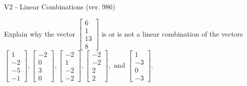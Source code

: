 \begin{exercise}
  \begin{exerciseTitle}V2 - Linear Combinations (ver. 986)\end{exerciseTitle}
  \begin{exerciseStatement}
    Explain why the vector \(\left[\begin{array}{c}
6 \\
1 \\
13 \\
8
\end{array}\right]\)  is or is not a linear 
	combination of the vectors \(\left[\begin{array}{c}
1 \\
-2 \\
-5 \\
-1
\end{array}\right] , \left[\begin{array}{c}
-2 \\
0 \\
3 \\
0
\end{array}\right] , \left[\begin{array}{c}
-2 \\
1 \\
-2 \\
-2
\end{array}\right] , \left[\begin{array}{c}
-2 \\
-2 \\
2 \\
2
\end{array}\right] , \text{ and } \left[\begin{array}{c}
1 \\
-3 \\
0 \\
-3
\end{array}\right]\).
	



\end{exerciseStatement}
\end{exercise}
